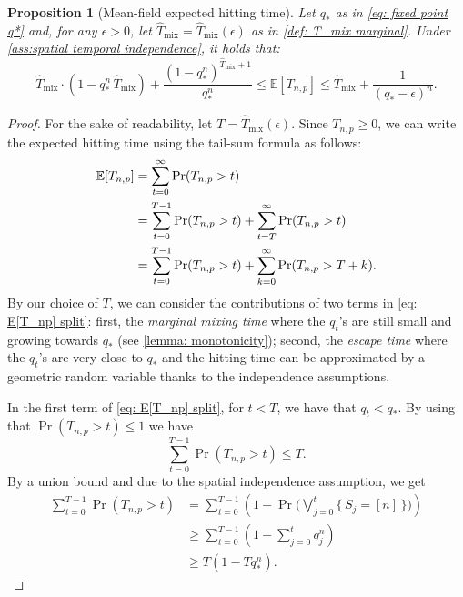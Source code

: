 \documentclass[11pt,a4paper]{article}
\newtheorem{proposition}[theorem]{Proposition}
\newcommand{\E}{\mathbb{E}}
\newcommand{\Tmar}{\hat{T}_{\mathrm{mix}}}
\begin{document}
\begin{proposition}[Mean-field expected hitting time]\label{prop:mean-field}
Let $q_*$ as in \cref{eq: fixed point q*} and, for any $\epsilon>0$, let $\Tmar = \Tmar(\epsilon)$ as in \cref{def: T_mix marginal}. 
Under \cref{ass:spatial temporal independence}, it holds that:
\[
    \Tmar\cdot(1 - q_*^n\, \Tmar) + \frac{(1- q_*^n)^{\Tmar+1}}{q_*^n}
    \le \E[T_{n,p}]
    \le \Tmar + \frac{1}{(q_*-\epsilon)^n}.
\]
\end{proposition}
\begin{proof}
For the sake of readability, let $T=\Tmar(\epsilon)$.
Since $T_{n,p} \ge 0$, we can write the expected hitting time using the tail-sum formula as follows:
\begin{align}
    \E[T_{n,p}] &= \sum_{t=0}^{\infty} \Pr(T_{n,p} > t) \notag\\
    &= \sum_{t=0}^{T-1} \Pr(T_{n,p} > t) + \sum_{t=T}^{\infty} \Pr(T_{n,p} > t) \notag\\
    &= \sum_{t=0}^{T-1} \Pr(T_{n,p} > t) + \sum_{k=0}^{\infty} \Pr(T_{n,p} > T+k).
    \label{eq: E[T_np] split}
\end{align}
By our choice of $T$, we can consider the contributions of two terms in \cref{eq: E[T_np] split}: first, the \textit{marginal mixing time} where the $q_t$'s are still small and growing towards $q_*$ (see \cref{lemma: monotonicity}); 
second, the \textit{escape time} where the $q_t$'s are very close to $q_*$ and the hitting time can be approximated by a geometric random variable thanks to the independence assumptions.

In the first term of \cref{eq: E[T_np] split}, for $t < T$, we have that $q_t < q_*$. 
By using that $\Pr(T_{n,p} > t) \le 1$ we have
\begin{equation*}
    \sum_{t=0}^{T-1} \Pr(T_{n,p} > t) \le T.
\end{equation*}
By a union bound and due to the spatial independence assumption, we get
\begin{align*}
    \sum_{t=0}^{T-1} \Pr(T_{n,p} > t) 
    &= \sum_{t=0}^{T-1} \left( 
        1 - \Pr\bigg(  \bigvee_{j=0}^{t} \{\, S_j = [n] \,\} \bigg) 
    \right) 
    \\
    &\ge \sum_{t=0}^{T-1} \left(
        1 - \sum_{j=0}^t q_j^n
    \right)
    \\
    &\ge T (1 - T q_*^n).
\end{align*}



\end{proof}
\end{document}

